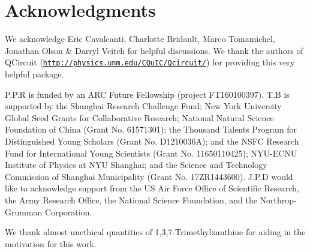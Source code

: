 %
%

\section*{Acknowledgments}

We acknowledge Eric Cavalcanti, Charlotte Bridault, Marco Tomamichel, Jonathan Olson \& Darryl Veitch for helpful discussions. We thank the authors of QCircuit (\texttt{\href{http://physics.unm.edu/CQuIC/Qcircuit/}{http://physics.unm.edu/CQuIC/Qcircuit/}}) for providing this very helpful package.

 P.P.R is funded by an ARC Future Fellowship (project FT160100397). T.B is supported by the Shanghai Research Challenge Fund; New York University Global Seed Grants for Collaborative Research; National Natural Science Foundation of China (Grant No. 61571301); the Thousand Talents Program for Distinguished Young Scholars (Grant No. D1210036A); and the NSFC Research Fund for International Young Scientists (Grant No. 11650110425); NYU-ECNU Institute of Physics at NYU Shanghai; and the Science and Technology Commission of Shanghai Municipality (Grant No. 17ZR1443600).  J.P.D would like to acknowledge support from the US Air Force Office of Scientific Research, the Army Research Office, the National Science Foundation, and the Northrop-Grumman Corporation.

We thank almost unethical quantities of 1,3,7-Trimethylxanthine for aiding in the motivation for this work.